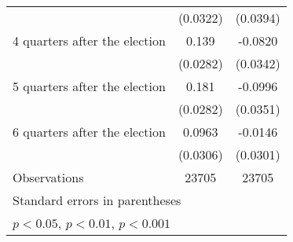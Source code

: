 \begin{table}[htbp]
\begin{tabular}{l*{2}{c}}
                    &    (0.0322)         &    (0.0394)         \\
[1em]
 4 quarters after the election&       0.139\sym{***}&     -0.0820\sym{*}  \\
                    &    (0.0282)         &    (0.0342)         \\
[1em]
 5 quarters after the election&       0.181\sym{***}&     -0.0996\sym{**} \\
                    &    (0.0282)         &    (0.0351)         \\
[1em]
 6 quarters after the election&      0.0963\sym{**} &     -0.0146         \\
                    &    (0.0306)         &    (0.0301)         \\
\hline
Observations        &       23705         &       23705         \\
\hline\hline
\multicolumn{3}{l}{\footnotesize Standard errors in parentheses}\\
\multicolumn{3}{l}{\footnotesize \sym{*} \(p<0.05\), \sym{**} \(p<0.01\), \sym{***} \(p<0.001\)}\\
\end{tabular}
\end{table}
